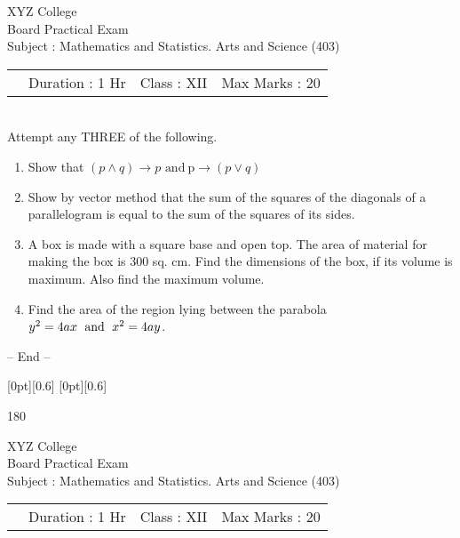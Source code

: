 \documentclass[14pt,a4paper]{extarticle}
\begin{document}
\begin{center}
XYZ College\\
Board Practical Exam\doublespacing \\
Subject : Mathematics and Statistics. Arts and Science (403)\\
\end{center}

\hspace{-0.5cm} 
\begin{tabu} to \textwidth { X[l] X[c] X[r]}
\ \  Duration : 1 Hr & Class : XII  & Max Marks : 20\\
\end{tabu} \\

  
 Attempt any THREE of the following.  
\begin{enumerate}
\item Show that 
$(p \wedge q)\to p$ $ \text{and} \ $p$ \to(p \vee q)$  
\item Show by vector method that the sum of the squares of the diagonals of a parallelogram is equal to the sum of the squares of its sides.
\item A box is made with a square base and open top. The area of material for making the box is 300 sq. cm. Find the dimensions of the box, if its volume is maximum. Also find the maximum volume.
\item Find the area of the region lying between the parabola\quad$y^2 = 4ax \text{\; and \;} x^2=4ay$\;.
\end{enumerate}
\begin{center} -- End --   \end{center}



\vspace{1.68em}
\raisebox{-0.5ex}[0pt][0.6\baselineskip]{}
\dotfill 
\raisebox {0.9ex}[0pt][0.6\baselineskip]{\begin{turn}{180} \end{turn}}


\begin{center}
XYZ College\\
Board Practical Exam\doublespacing \\
Subject : Mathematics and Statistics. Arts and Science (403)\\
\end{center}

\hspace{-0.5cm} 
\begin{tabu} to \textwidth { X[l] X[c] X[r]}
\ \  Duration : 1 Hr & Class : XII  & Max Marks : 20\\
\end{tabu} \\
\end{document}
